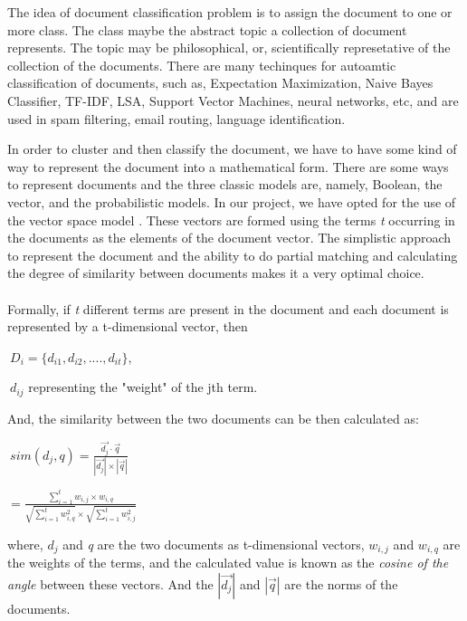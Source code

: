 \documentclass[12pt]{article}
\begin{document}
        The idea of document classification problem is to assign the document to one or more class. The class maybe the abstract topic a collection of document represents. The topic may be philosophical, or, scientifically represetative
        of the collection of the documents. There are many techinques for autoamtic classification of documents, such as, Expectation Maximization, Naive Bayes Classifier, TF-IDF, LSA, Support Vector Machines,
         neural networks, etc, and are used in spam filtering, email routing, language identification\cite{wikipedia2021}. 
        

        In order to cluster and then classify the document, we have to have some kind of way to represent the document into a mathematical form. There are some ways to represent documents and the three classic models are, namely, 
        Boolean, the vector, and the probabilistic models\cite{baeza1999modern}. In our project, we have opted for the use of the vector space model \cite{salton1975vector}. These vectors are formed using the terms \emph{t} occurring in the documents 
        as the elements of the document vector. The simplistic approach to represent the document and the ability to do partial matching and calculating the degree
        of similarity between documents makes it a very optimal choice. 
        \paragraph{}Formally, if \emph{t} different terms are present in the document and each document is represented by a t-dimensional vector, then 
        \begin{center}
           $~{D_i = \{d_{i1}, d_{i2},....,d_{it}\}}$, \\
        \end{center} 
        $~{d_{ij}}$ representing the "weight" of the jth term\cite{salton1975vector}.

        And, the similarity between the two documents can be then calculated as:
            \begin{center}
                $~{   sim(d_j, q) =  \frac{  \vec{d_j} \cdot \vec{q}  } {|\vec{d_j}|  \times |\vec{q}|  }  }$

               \hspace{4.5cm} ${= \frac{\sum_{i=1}^{t}w_{i,j}\times w_{i,q}} {\sqrt{\sum_{i=1}^{t}w_{i,q}^2} \times \sqrt{\sum_{i=1}^{t}w_{i,j}^2}}}$
            \end{center}
            where, \textit{${d_j}$} and \emph{q} are the two documents as t-dimensional vectors, ${w_{i,j}}$ and ${w_{i,q}}$ are the weights of the terms, and the calculated value is known 
            as the \emph{cosine of the angle} between these vectors\cite{baeza1999modern}. And the ${|\vec{d_j}|}$ and ${|\vec{q}|}$ are the norms of the documents.
        
\end{document}
